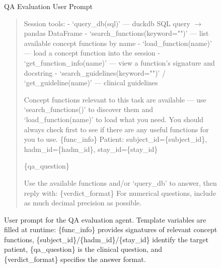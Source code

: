 \begin{figure}[h]
    \begin{AIbox}{QA Evaluation User Prompt}

\begin{quote}
\ttfamily
\tiny
\vspace{2mm}

Session tools:
- `query\_db(sql)' --- duckdb SQL query $\rightarrow$ pandas DataFrame
- `search\_functions(keyword="")' --- list available concept functions by name
- `load\_function(name)' --- load a concept function into the session
- `get\_function\_info(name)' --- view a function's signature and docstring
- `search\_guidelines(keyword="")' / `get\_guideline(name)' --- clinical guidelines

Concept functions relevant to this task are available --- use `search\_functions()' to discover them and `load\_function(name)' to load what you need. You should always check first to see if there are any useful functions for you to use.
\{func\_info\}
Patient: subject\_id=\{subject\_id\}, hadm\_id=\{hadm\_id\}, stay\_id=\{stay\_id\}

\{qa\_question\}

Use the available functions and/or `query\_db' to answer, then reply with: \{verdict\_format\}
For numerical questions, include as much decimal precision as possible.

\end{quote}

\end{AIbox}
    \caption{User prompt for the QA evaluation agent. Template variables are filled at runtime: \{func\_info\} provides signatures of relevant concept functions, \{subject\_id\}/\{hadm\_id\}/\{stay\_id\} identify the target patient, \{qa\_question\} is the clinical question, and \{verdict\_format\} specifies the answer format.}
    \label{prompts:qa_user_prompt}

\end{figure}
